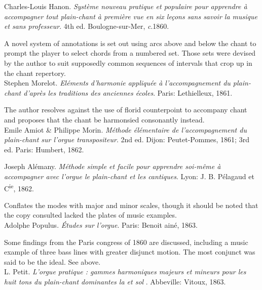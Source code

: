     \parindent=0pt
    \hangindent=0pt
  Charles-Louis Hanon. \emph{Système nouveau pratique et populaire pour apprendre à accompagner tout plain-chant à première vue en six leçons sans savoir la musique et sans professeur}. 4th ed. Boulogne-sur-Mer, \emph{c}.1860.

     \parindent=20pt
     \hangindent=20pt
     A novel system of annotations is set out using arcs above and below the chant to prompt the player to select chords from a numbered set. Those sets were devised by the author to suit supposedly common sequences of intervals that crop up in the chant repertory.\\

    \parindent=0pt
    \hangindent=0pt
  Stephen Morelot. \emph{Eléments d'harmonie appliquée à l'accompagnement du plain-chant d'après les traditions des anciennes écoles}. Paris:  Lethielleux, 1861.

     \parindent=20pt
     \hangindent=20pt
     The author resolves against the use of florid counterpoint to accompany chant and proposes that the chant be harmonsied consonantly instead.\\

    \parindent=0pt
    \hangindent=0pt
  \covid{}Emile Amiot \& Philippe Morin. \emph{Méthode élémentaire de l'accompagnement du plain-chant sur l'orgue transpositeur}. 2nd ed. Dijon:  Peutet-Pommes, 1861;  3rd ed. Paris:  Humbert, 1862. \\\pagebreak{}

    \parindent=0pt
    \hangindent=0pt
  Joseph Alémany. \emph{Méthode simple et facile pour apprendre soi-même à accompagner avec l'orgue le plain-chant et les cantiques}. Lyon:  J. B. Pélagaud et C\textsuperscript{ie}, 1862.

     \parindent=20pt
     \hangindent=20pt
     Conflates the modes with major and minor scales, though it should be noted that the copy consulted lacked the plates of music examples.\\

    \parindent=0pt
    \hangindent=0pt
  Adolphe Populus. \emph{Études sur l'orgue}. Paris:  Benoit ainé, 1863.

     \parindent=20pt
     \hangindent=20pt
     Some findings from the Paris congress of 1860 are discussed, including a music example of three bass lines with greater disjunct motion. The most conjunct was said to be the ideal. See  above.\\

    \parindent=0pt
    \hangindent=0pt
  L. Petit. \emph{L'orgue pratique : gammes harmoniques majeurs et mineurs pour les huit tons du plain-chant dominantes la et sol }. Abbeville:  Vitoux, 1863.

